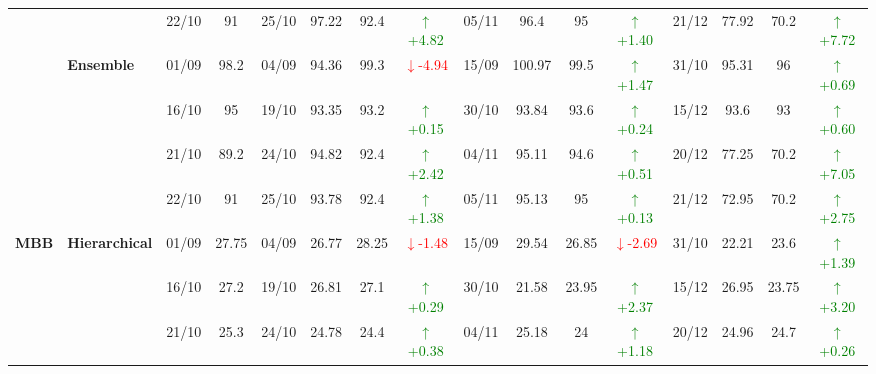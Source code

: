 \documentclass{ieeeaccess}
\begin{document}
{\begin{longtable}{llcc|cccc|cccc|cccc}
&
& 22/10 & 91 & 25/10 & 97.22 & 92.4 & \textcolor{green}{\(\uparrow\)+4.82} & 05/11 & 96.4 & 95 & \textcolor{green}{\(\uparrow\)+1.40} & 21/12 & 77.92 & 70.2 & \textcolor{green}{\(\uparrow\)+7.72} \\
\cmidrule(lr){2-16}


& \textbf{Ensemble}
& 01/09 & 98.2 & 04/09 & 94.36 & 99.3 & \textcolor{red}{\(\downarrow\)-4.94} & 15/09 & 100.97 & 99.5 & \textcolor{green}{\(\uparrow\)+1.47} & 31/10 & 95.31 & 96 & \textcolor{green}{\(\uparrow\)+0.69} \\

&
& 16/10 & 95 & 19/10 & 93.35 & 93.2 & \textcolor{green}{\(\uparrow\)+0.15} & 30/10 & 93.84 & 93.6 & \textcolor{green}{\(\uparrow\)+0.24} & 15/12 & 93.6 & 93 & \textcolor{green}{\(\uparrow\)+0.60} \\

&
& 21/10 & 89.2 & 24/10 & 94.82 & 92.4 & \textcolor{green}{\(\uparrow\)+2.42} & 04/11 & 95.11 & 94.6 & \textcolor{green}{\(\uparrow\)+0.51} & 20/12 & 77.25 & 70.2 & \textcolor{green}{\(\uparrow\)+7.05} \\

&
& 22/10 & 91 & 25/10 & 93.78 & 92.4 & \textcolor{green}{\(\uparrow\)+1.38} & 05/11 & 95.13 & 95 & \textcolor{green}{\(\uparrow\)+0.13} & 21/12 & 72.95 & 70.2 & \textcolor{green}{\(\uparrow\)+2.75} \\
\midrule



\multirow{12}{*}{\textbf{MBB}} 
& \textbf{Hierarchical}
& 01/09 & 27.75 & 04/09 & 26.77 & 28.25 & \textcolor{red}{\(\downarrow\)-1.48} & 15/09 & 29.54 & 26.85 & \textcolor{red}{\(\downarrow\)-2.69} & 31/10 & 22.21 & 23.6 & \textcolor{green}{\(\uparrow\)+1.39} \\

&
& 16/10 & 27.2 & 19/10 & 26.81 & 27.1 & \textcolor{green}{\(\uparrow\)+0.29} & 30/10 & 21.58 & 23.95 & \textcolor{green}{\(\uparrow\)+2.37} & 15/12 & 26.95 & 23.75 & \textcolor{green}{\(\uparrow\)+3.20} \\

&
& 21/10 & 25.3 & 24/10 & 24.78 & 24.4 & \textcolor{green}{\(\uparrow\)+0.38} & 04/11 & 25.18 & 24 & \textcolor{green}{\(\uparrow\)+1.18} & 20/12 & 24.96 & 24.7 & \textcolor{green}{\(\uparrow\)+0.26} \\


\end{longtable}}
\end{document}
